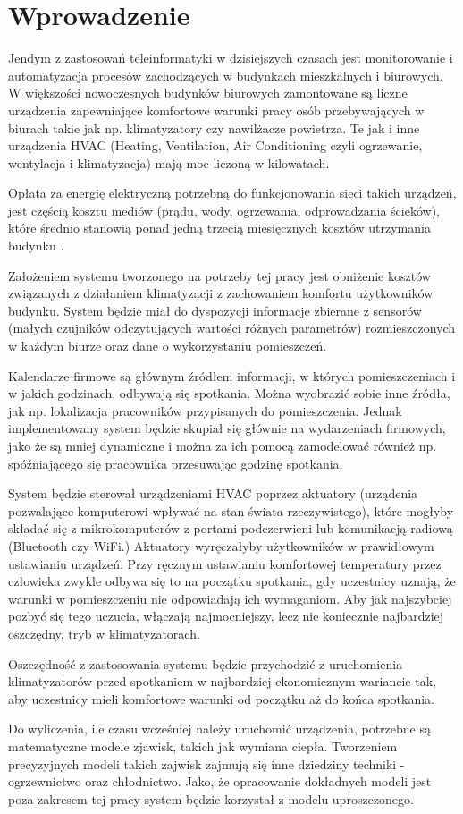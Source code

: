 \chapter{Wprowadzenie}
Jendym z zastosowań teleinformatyki w dzisiejszych czasach jest monitorowanie i automatyzacja procesów zachodzących w budynkach mieszkalnych i biurowych. 
W większości nowoczesnych budynków biurowych zamontowane są liczne urządzenia zapewniające komfortowe warunki pracy osób przebywających w biurach takie jak np. klimatyzatory czy nawilżacze powietrza. Te jak i inne urządzenia HVAC (Heating, Ventilation, Air Conditioning czyli ogrzewanie, wentylacja i klimatyzacja) mają moc liczoną w kilowatach.

Opłata za energię elektryczną potrzebną do funkcjonowania sieci takich urządzeń, jest częścią kosztu mediów (prądu, wody, ogrzewania, odprowadzania ścieków), które średnio stanowią ponad jedną trzecią miesięcznych kosztów utrzymania budynku \cite{bib:raportKoszty}.

Założeniem systemu tworzonego na potrzeby tej pracy jest obniżenie kosztów związanych z działaniem klimatyzacji z zachowaniem komfortu użytkowników budynku. 
System będzie miał do dyspozycji informacje zbierane z sensorów (małych czujników odczytujących wartości różnych parametrów) rozmieszczonych w każdym biurze oraz dane o wykorzystaniu pomieszczeń. 



Kalendarze firmowe są głównym źródłem informacji, w których pomieszczeniach i w jakich godzinach, odbywają się spotkania. Można wyobrazić sobie inne źródła, jak np. lokalizacja pracowników przypisanych do pomieszczenia. 
Jednak implementowany system będzie skupiał się głównie na wydarzeniach firmowych, jako że są mniej dynamiczne i można za ich pomocą zamodelować również np. spóźniającego się pracownika przesuwając godzinę spotkania.

System będzie sterował urządzeniami HVAC poprzez aktuatory (urządenia pozwalające komputerowi wpływać na stan świata rzeczywistego), które mogłyby składać się z mikrokomputerów z portami podczerwieni lub komunikacją radiową (Bluetooth czy WiFi.)
Aktuatory wyręczałyby użytkowników w prawidłowym ustawianiu urządzeń.
Przy ręcznym ustawianiu komfortowej temperatury przez człowieka zwykle odbywa się to na początku spotkania, gdy uczestnicy uznają, że warunki w pomieszczeniu nie odpowiadają ich wymaganiom. 
Aby jak najszybciej pozbyć się tego uczucia, włączają najmocniejszy, lecz nie koniecznie najbardziej oszczędny, tryb w klimatyzatorach.

Oszczędność z zastosowania systemu będzie przychodzić z uruchomienia klimatyzatorów przed spotkaniem w najbardziej ekonomicznym wariancie tak, aby uczestnicy mieli komfortowe warunki od początku aż do końca spotkania. 

Do wyliczenia, ile czasu wcześniej należy uruchomić urządzenia, potrzebne są matematyczne modele zjawisk, takich jak wymiana ciepła. 
Tworzeniem precyzyjnych modeli takich zajwisk zajmują się inne dziedziny techniki - ogrzewnictwo oraz chłodnictwo. 
Jako, że opracowanie dokładnych modeli jest poza zakresem tej pracy system będzie korzystał z modelu uproszczonego. 
